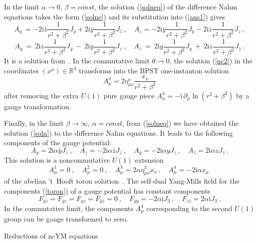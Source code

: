 \documentclass[a4paper,11pt]{article}
\makeatletter
\renewcommand{\section}{\@startsection{section}{1}{0pt}{\medskipamount}
{\medskipamount}{\large\bf}}
\numberwithin{equation}{section}
\def\th{\theta}
\def\a{\alpha}
\def\b{\beta}
\def\m{\mu}
\def\n{\nu}
\def\pa{\partial}
\newcommand{\im}{\mathrm{i}}
\newcommand{\zb}{{\bar{z}}}
\newcommand{\yb}{{\bar{y}}}
\newcommand{\rc}{{\mathbb{R}^4}}
\makeatother
\begin{document}
In the limit $\a\to 0$, $\b =const$,  the solution (\ref{solneq}) of the 
difference Nahm equations takes the form  (\ref{solne})
and its substitution into  (\ref{ans1}) gives
$$A_y\ = - 2\im\bar z\frac{1 }{r^2 + \b^2}J_y + 2\im \bar y
 \frac{1 }{r^2 +\b^2 }J_{\bar z} \ , 
\quad
A_z = - 2\im \bar y \frac{1 }{r^2 +\b^2 } J_{\bar y}- 2\im \bar z
  \frac{1 }{r^2 +\b^2 }J_z     \ , 
$$
\begin{equation}\label{nc2}
A_{\bar y}\ = \ 2\im z \frac{1 }{ r^2 +\b^2 } J_{\bar y}\ -\  2\im  y
 \frac{1}{r^2 +\b^2}J_z \ ,
\quad
A_{\bar z}\ =\  2\im  y\frac{ 1}{r^2 + \b^2}J_y 
\ +\ 2\im  z\frac{1 }{r^2 +\b^2}J_{\bar z}\ . 
\end{equation}
It is a solution from~\cite{Correa1}.
In the commutative limit $\th\to 0$, the solution (\ref{nc2}) in the coordinates
$(x^\m)\in\rc$ transforms into the BPST one-instanton solution
\begin{equation}\label{one}
A_\m^a = 2\eta^a_{\m\n}\frac{x_\n}{r^2 + \b^2}
\end{equation}
after removing the extra $U(1)$ pure gauge piece $A_\m^4=-\im \, \pa_\m \ln (r^2+\b^2)$ by a
gauge transformation.


Finally, in  the limit $\b\to\infty$, $\a = const$, from 
(\ref{solneq}) we have obtained the solution (\ref{soln}) to the 
difference Nahm equations. It leads to the following components of the
gauge potential: 
\begin{equation}
A_y = 2\im\a \yb  J_{\zb}\ , \quad A_z = -2\im\a \zb  J_z\ , \quad
A_{\yb} = - 2\im\a  y J_{z} \ , \quad A_\zb = 2\im \a z  J_\zb \ .
\label{anstor}
\end{equation}
This solution is a noncommutative $U(1)$ extension  
\begin{equation}\label{toron}
A_\m^1=0\ ,\quad
A_\m^2=0\ , \quad
A_\m^3=2\a\eta^3_{\m\n}{x_\n}\ ,\quad A_\m^4=-2\im\a{x_\m}\ 
\end{equation}
of the abelian 't~Hooft toron solution~\cite{'tHooft}.
The self-dual Yang-Mills field for the components (\ref{toron}) of 
a gauge potential has constant components
\begin{equation}
F_{y\zb}= F_{\yb z}=F_{yz}=F_{\yb\zb}=0\ , \quad
F_{y\yb}= - 2\a \im J_3 \ , \quad
F_{z\zb}= 2\a \im J_3\ . 
\end{equation}
In the commutative limit, the components $A_\m^4$ corresponding to the second 
$U(1)$ group can be gauge transformed to zero.

\section{Reductions of ncYM equations}
\end{document}
